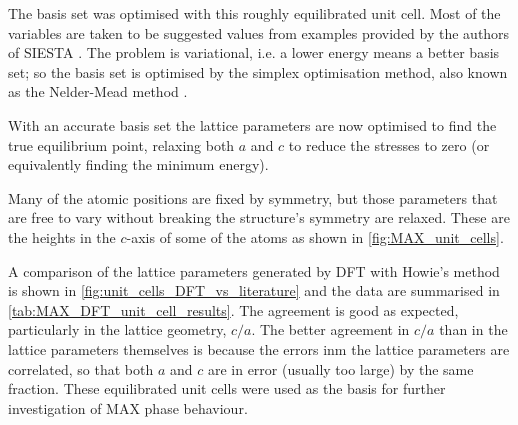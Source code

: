 The basis set was optimised with this roughly equilibrated unit cell. Most of the variables are taken to be suggested values  from examples provided by the authors of SIESTA \cite{SIESTA_manual}. The problem is variational, i.e. a lower energy means a better basis set; so the basis set is optimised by the simplex optimisation method, also known as the Nelder-Mead method \citep{Nelder1965}.

With an accurate basis set the lattice parameters are now optimised to find the true equilibrium point, relaxing both $a$ and $c$ to reduce the stresses to zero (or equivalently finding the minimum energy).


Many of the atomic positions are fixed by symmetry, but those parameters that are free to vary without breaking the structure's symmetry are relaxed. These are the heights in the $c$-axis of some of the atoms as shown in \autoref{fig:MAX_unit_cells}.


A comparison of the lattice parameters generated by DFT with Howie's method is shown in \autoref{fig:unit_cells_DFT_vs_literature} and the data are summarised in \autoref{tab:MAX_DFT_unit_cell_results}. The agreement is good as expected, particularly in the lattice geometry, $c/a$. The better agreement in $c/a$ than in the lattice parameters themselves is because the errors inm the lattice parameters are correlated, so that both $a$ and $c$ are in error (usually too large) by the same fraction. These equilibrated unit cells were used as the basis for further investigation of MAX phase behaviour.


